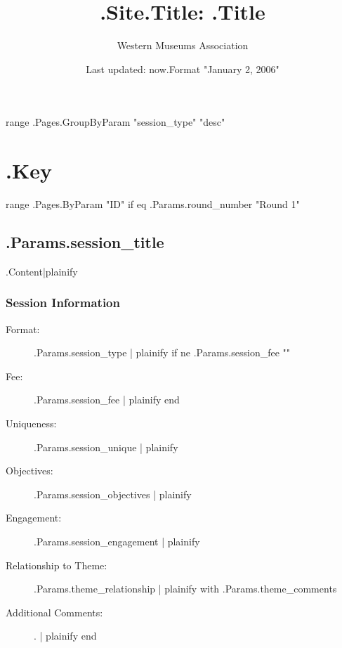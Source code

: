 \documentclass{report}
\title{ {{.Site.Title}}: {{.Title }} }
\date{ Last updated: {{ now.Format "January 2, 2006"}}}
\author{Western Museums Association}
\begin{document}
  \maketitle
  \newpage
  \tableofcontents
  \newpage
  {{ range .Pages.GroupByParam "session_type" "desc"}}
    \newpage
    \chapter*{ {{.Key}} }

      {{ range .Pages.ByParam "ID" }}
        {{ if eq .Params.round_number "Round 1" }}
          \newpage
          \section{ {{.Params.session_title}} }

              {{.Content|plainify}}
              \subsection*{Session Information}
                \begin{description}
                  \item [Format:] {{.Params.session_type | plainify }}
							    {{ if ne .Params.session_fee "" }}
								  \item [Fee:]{{.Params.session_fee | plainify}}
							     {{end}}
							    \item [Uniqueness:]{{.Params.session_unique | plainify }}
							    \item [Objectives:]{{.Params.session_objectives | plainify }}
							    \item [Engagement:]{{.Params.session_engagement | plainify }}
							    \item [Relationship to Theme:]{{.Params.theme_relationship | plainify }}
							    {{ with .Params.theme_comments }}
                    \item [Additional Comments: ]{{ . | plainify  }}{{end}}
                \end{description}
\end{document}

